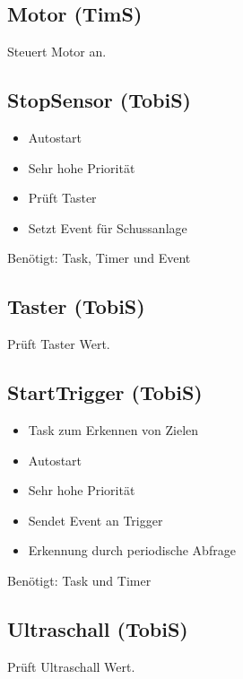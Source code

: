 \documentclass[a4paper,11pt]{scrreprt}
\begin{document}
\subsection*{Motor (TimS)}

Steuert Motor an.

\subsection*{StopSensor (TobiS)}

\begin{itemize}
 \item Autostart
 \item Sehr hohe Priorität
 \item Prüft Taster
 \item Setzt Event für Schussanlage
\end{itemize}

Benötigt: Task, Timer und Event

\subsection*{Taster (TobiS)}

Prüft Taster Wert.

\subsection*{StartTrigger (TobiS)}

\begin{itemize}
 \item Task zum Erkennen von Zielen
 \item Autostart
 \item Sehr hohe Priorität
 \item Sendet Event an Trigger
 \item Erkennung durch periodische Abfrage
\end{itemize}

Benötigt: Task und Timer

\subsection*{Ultraschall (TobiS)}

Prüft Ultraschall Wert.
\end{document}
